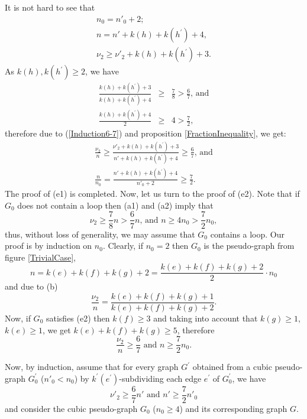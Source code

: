 \documentclass[fleqn,12pt,twoside]{article}
\newenvironment{proof}[1][Proof.]{\begin{trivlist}
\item[\hskip \labelsep {\bfseries #1}]}{\end{trivlist}}
\begin{document}
\begin{proof}
It is not hard to see that
\begin{gather*}
n_0=n'_0+2;
\\
n =n'+k(h)+k(h^{\prime })+4, \\
\nu _{2}\geq \nu' _{2}+k(h)+k(h^{\prime })+3.
\end{gather*}
As $k(h),k(h^{\prime })\geq 2$, we have
\begin{eqnarray*}
\frac{k(h)+k(h^{\prime })+3}{k(h)+k(h^{\prime })+4} &\geq &\frac{7}{8}>\frac{6}{7}\text{, and} \\
\frac{k(h)+k(h^{\prime })+4}{2} &\geq &4>\frac{7}{2},
\end{eqnarray*}therefore due to (\ref{Induction6-7}) and proposition \ref {FractionInequality}, we get:\begin{gather*}
\frac{\nu _{2}}{n}\geq \frac{\nu' _{2}+k(h)+k(h^{\prime })+3}{n'
+k(h)+k(h^{\prime })+4}\geq \frac{6}{7}\text{, and} \\
\frac{n }{n_0}=\frac{n'+k(h)+k(h^{\prime })+4}{n'_0+2}\geq \frac{7}{2}.
\end{gather*}The proof of (e1) is completed. Now, let us turn to the proof of
(e2). Note that if $G_{0}$ does not contain a loop then (a1) and
(a2) imply that
\begin{equation*}
\nu _{2}\geq \frac{7}{8}n >\frac{6}{7}n \text{, and }n \geq 4n_0
>\frac{7}{2}n_0,
\end{equation*}thus, without loss of generality, we may assume that $G_{0}$
contains a loop.
Our proof is by induction on $n_0$. Clearly, if $n_0=2$ then $G_{0}$ is the pseudo-graph from figure
\ref{TrivialCase},
\begin{equation*}
n=k(e)+k(f)+k(g)+2=\frac{k(e)+k(f)+k(g)+2}{2}\cdot n_0
\end{equation*}and due to (b)\begin{equation*}
\frac{\nu _{2}}{n}=\frac{k(e)+k(f)+k(g)+1}{k(e)+k(f)+k(g)+2}\text{.}
\end{equation*}Now, if $G_{0}$ satisfies (e2) then $k(f)\geq 3$ and taking into
account that $k(g)\geq 1$, $k(e)\geq 1$, we get $k(e)+k(f)+k(g)\geq
5$, therefore
\begin{equation*}
\frac{\nu _{2}}{n}\geq \frac{6}{7}\text{ and }n \geq \frac{7}{2}n_0.
\end{equation*}

Now, by induction, assume that for every graph $G^{\prime }$
obtained from a cubic pseudo-graph $G_{0}^{\prime }$ ($n'_0 <n_0$)
by $k^{\prime }(e^{\prime }) $-subdividing each edge $e^{\prime }$
of $G_{0}^{\prime }$, we have
\begin{equation*}
\nu' _{2}\geq \frac{6}{7}n' \text{ and }n' \geq \frac{7}{2}n'_0
\end{equation*}and consider the cubic pseudo-graph $G_{0}$ ($n_0\geq 4$) and its
corresponding graph $G$.


\end{proof}
\end{document}
